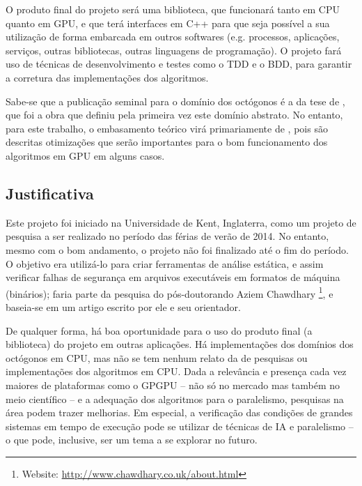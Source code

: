     O produto final do projeto será uma biblioteca, que funcionará tanto em 
    \gls{CPU} quanto em \gls{GPU}, e que terá interfaces em C++ para que seja 
    possível a sua utilização de forma embarcada em outros softwares (e.g. 
    processos, aplicações, serviços, outras bibliotecas, outras linguagens de 
    programação). O projeto fará uso de técnicas de desenvolvimento e testes 
    como o \gls{TDD} e o \gls{BDD}, para garantir a corretura das 
    implementações dos algoritmos.
    
    Sabe-se que a publicação seminal para o domínio dos octógonos é a da tese 
    de , que foi a obra que definiu pela primeira 
    vez este domínio abstrato. No entanto, para este trabalho, o embasamento 
    teórico virá primariamente de , pois são 
    descritas otimizações que serão importantes para o bom funcionamento dos 
    algoritmos em \gls{GPU} em alguns casos.
    
    
        \subsection{Justificativa}
    
        Este projeto foi iniciado na Universidade de Kent, Inglaterra, como um 
        projeto de pesquisa a ser realizado no período das férias de verão de 
        2014. No entanto, mesmo com o bom andamento, o projeto não foi 
        finalizado até o fim do período. O objetivo era utilizá-lo para criar 
        ferramentas de análise estática, e assim verificar falhas de segurança 
        em arquivos executáveis em formatos de máquina (binários); faria parte 
        da pesquisa do pós-doutorando Aziem Chawdhary \footnote{Website: 
        \url{http://www.chawdhary.co.uk/about.html}}, e baseia-se em um artigo 
        escrito por ele e seu orientador.
    
        De qualquer forma, há boa oportunidade para o uso do produto final (a 
        biblioteca) do projeto em outras aplicações. Há implementações dos 
        domínios dos octógonos em \gls{CPU}, mas não se tem nenhum relato da de 
        pesquisas ou implementações dos algoritmos em \gls{CPU}. Dada a 
        relevância e presença cada vez maiores de plataformas como o 
        \gls{GPGPU} -- não só no mercado mas também no meio científico -- e a 
        adequação dos algoritmos para o paralelismo, pesquisas na área podem 
        trazer melhorias. Em especial, a verificação das condições de grandes 
        sistemas em tempo de execução pode se utilizar de técnicas de \gls{IA} 
        e paralelismo -- o que pode, inclusive, ser um tema a se explorar no 
        futuro.
    

